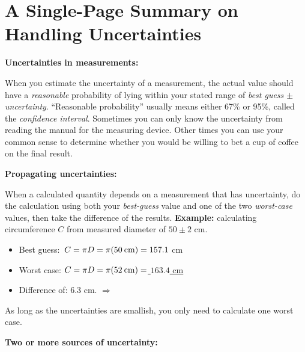 \section{A Single-Page Summary on Handling Uncertainties}

\textbf{Uncertainties in measurements:}
\vspace{-0.15cm}

When you estimate the uncertainty of a measurement, the actual value should have a \textit{reasonable} probability of lying within your stated range of \textit{best guess $\pm$ uncertainty}.  ``Reasonable probability'' usually means either 67\% or 95\%, called the \textit{confidence interval}.  Sometimes you can only know the uncertainty from reading the manual for the measuring device.  Other times you can use your common sense to determine whether you would be willing to bet a cup of coffee on the final result.
\vspace{+0.15cm}

\textbf{Propagating uncertainties:}
\vspace{-0.15cm}

When a calculated quantity depends on a measurement that has uncertainty, do the calculation using both your \textit{best-guess} value and one of the two \textit{worst-case} values, then take the difference of the results.  \textbf{Example:} calculating circumference $C$ from measured diameter of $50\pm2$ cm.
\begin{itemize} \itemsep1pt
\vspace{-0.35cm}
	\item Best guess: $\,C=\pi D =\pi(50 \:\rm{cm}) = 157.1$ cm
	\item Worst case: $C=\pi D =\pi(52 \:\rm{cm}) =$\underline{ $163.4$  cm}
\vspace{-0.10cm}
	\item Difference of:        \hspace{100pt}                   6.3 cm. $\Longrightarrow$ 
\end{itemize}
\vspace{-0.35cm}
As long as the uncertainties are smallish, you only need to calculate one worst case.
\vspace{+0.15cm}

\textbf{Two or more sources of uncertainty:}
\vspace{-0.15cm}

